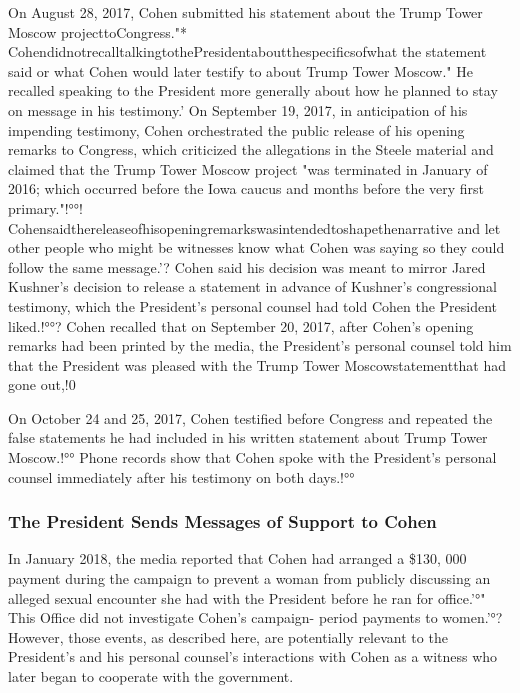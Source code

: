 On August 28, 2017, Cohen submitted his statement about the Trump Tower Moscow projecttoCongress."* CohendidnotrecalltalkingtothePresidentaboutthespecificsofwhat the statement said or what Cohen would later testify to about Trump Tower Moscow."
He recalled speaking to the President more generally about how he planned to stay on message in his testimony.'
On September 19, 2017, in anticipation of his impending testimony, Cohen orchestrated the public release of his opening remarks to Congress, which criticized the allegations in the Steele material and claimed that the Trump Tower Moscow project "was terminated in January of 2016; which occurred before the Iowa caucus and months before the very first primary."!°°!
Cohensaidthereleaseofhisopeningremarkswasintendedtoshapethenarrative and let other people who might be witnesses know what Cohen was saying so they could follow the same message.'?
Cohen said his decision was meant to mirror Jared Kushner's decision to release a statement in advance of Kushner's congressional testimony, which the President's personal counsel had told Cohen the President liked.!°°?
Cohen recalled that on September 20, 2017, after Cohen's opening remarks had been printed by the media, the President's personal counsel told him that the President was pleased with the Trump Tower Moscowstatementthat had gone out,!0%

On October 24 and 25, 2017, Cohen testified before Congress and repeated the false statements he had included in his written statement about Trump Tower Moscow.!°°
Phone records show that Cohen spoke with the President's personal counsel immediately after his testimony on both days.!°°%

\subsubsection{The President Sends Messages of Support to Cohen}

In January 2018, the media reported that Cohen had arranged a \$130, 000 payment during the campaign to prevent a woman from publicly discussing an alleged sexual encounter she had with the President before he ran for office.'°"
This Office did not investigate Cohen's campaign- period payments to women.'°?
However, those events, as described here, are potentially relevant to the President's and his personal counsel's interactions with Cohen as a witness who later began to cooperate with the government.

